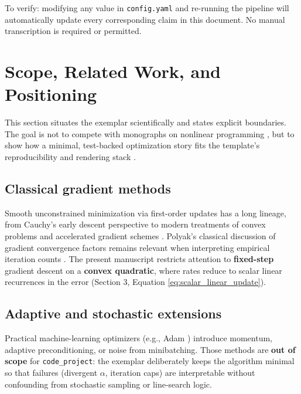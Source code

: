 \documentclass[
]{article}
\begin{document}
To verify: modifying any value in \texttt{config.yaml} and re-running
the pipeline will automatically update every corresponding claim in this
document. No manual transcription is required or permitted.

\newpage

\section{Scope, Related Work, and
Positioning}\label{scope-related-work-and-positioning}

This section situates the exemplar scientifically and states explicit
boundaries. The goal is not to compete with monographs on nonlinear
programming \cite{nocedal2006numerical,bertsekas1999nonlinear}, but to
show how a minimal, test-backed optimization story fits the template's
reproducibility and rendering stack \cite{peng2011reproducible}.

\subsection{Classical gradient
methods}\label{classical-gradient-methods}

Smooth unconstrained minimization via first-order updates has a long
lineage, from Cauchy's early descent perspective
\cite{cauchy1847methode} to modern treatments of convex problems
\cite{boyd2004convex} and accelerated gradient schemes
\cite{nesterov2013gradient}. Polyak's classical discussion of gradient
convergence factors remains relevant when interpreting empirical
iteration counts \cite{polyak1964some}. The present manuscript restricts
attention to \textbf{fixed-step} gradient descent on a \textbf{convex
quadratic}, where rates reduce to scalar linear recurrences in the error
(Section 3, Equation \ref{eq:scalar_linear_update}).

\subsection{Adaptive and stochastic
extensions}\label{adaptive-and-stochastic-extensions}

Practical machine-learning optimizers (e.g., Adam \cite{kingma2014adam})
introduce momentum, adaptive preconditioning, or noise from
minibatching. Those methods are \textbf{out of scope} for
\texttt{code\_project}: the exemplar deliberately keeps the algorithm
minimal so that failures (divergent \(\alpha\), iteration caps) are
interpretable without confounding from stochastic sampling or
line-search logic.
\end{document}
